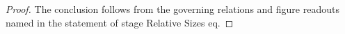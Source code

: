 \begin{proof}
  The conclusion follows from the governing relations and figure readouts named in the statement of stage Relative Sizes eq.
\end{proof}

